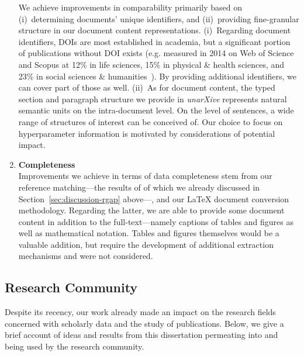 \begin{enumerate}
We achieve improvements in comparability primarily based on (i)~determining documents' unique identifiers, and (ii)~providing fine-granular structure in our document content representations. (i)~Regarding document identifiers, DOIs are most established in academia, but a significant portion of publications without DOI exists (e.g. 
measured in 2014 on Web of Science and Scopus at 12\% in life sciences, 15\% in physical \& health sciences, and 23\% in social sciences \& humanities~\cite{Gorraiz2016}).
By providing additional identifiers, we can cover part of those as well. (ii)~As for document content, the typed section and paragraph structure we provide in \textit{unarXive} represents natural semantic units on the intra-document level. On the level of sentences, a wide range of structures of interest can be conceived of. Our choice to focus on hyperparameter information is motivated by considerations of potential impact.
\item \textbf{Completeness}\\
Improvements we achieve in terms of data completeness stem from our reference matching---the results of of which we already discussed in Section~\ref{sec:discussion-rgap} above---, and our \LaTeX{} document conversion methodology. Regarding the latter, we are able to provide some document content in addition to the full-text---namely captions of tables and figures as well as mathematical notation. Tables and figures themselves would be a valuable addition, but require the development of additional extraction mechanisms and were not considered. %
\end{enumerate}

\subsection{Research Community}
Despite its recency, our work already made an impact on the research fields concerned with scholarly data and the study of publications. Below, we give a brief account of ideas and results from this dissertation permeating into and being used by the research community.

